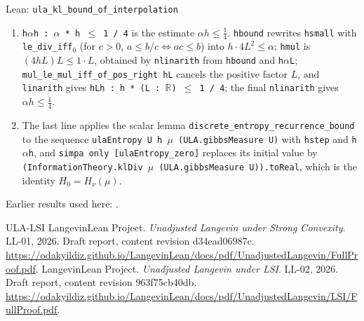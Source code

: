 \documentclass[11pt,a4paper]{article}
\begin{document}
\begin{leanbox}{Lean: \texttt{ula\_\allowbreak{}kl\_\allowbreak{}bound\_\allowbreak{}of\_\allowbreak{}interpolation}}
\begin{enumerate}
\item \texttt{h\ensuremath{\alpha}h : \ensuremath{\alpha} * h \ensuremath{\le} 1 /\allowbreak{} 4} is the estimate \(\alpha h\le\frac14\). \texttt{hbound} rewrites \texttt{hsmall} with \texttt{le\_\allowbreak{}div\_\allowbreak{}iff\ensuremath{{}_{0}}} (for \(c>0\), \(a\le b/c\iff ac\le b\)) into \(h\cdot4L^2\le\alpha\); \texttt{hmul} is \((4hL)L\le1\cdot L\), obtained by \texttt{nlinarith} from \texttt{hbound} and \texttt{h\ensuremath{\alpha}\allowbreak{}L}; \texttt{mul\_\allowbreak{}le\_\allowbreak{}mul\_\allowbreak{}iff\_\allowbreak{}of\_\allowbreak{}pos\_\allowbreak{}right h\allowbreak{}L} cancels the positive factor \(L\), and \texttt{linarith} gives \texttt{h\allowbreak{}Lh : h * (L : \ensuremath{\mathbb R}) \ensuremath{\le} 1 /\allowbreak{} 4}; the final \texttt{nlinarith} gives \(\alpha h\le\frac14\).

\item The last line applies the scalar lemma \texttt{discrete\_\allowbreak{}entropy\_\allowbreak{}recurrence\_\allowbreak{}bound} to the sequence \texttt{ula\allowbreak{}Entropy U h \ensuremath{\mu} (ULA.\allowbreak{}gibbs\allowbreak{}Measure U)} with \texttt{hstep} and \texttt{h\ensuremath{\alpha}h}, and \texttt{simpa only [ula\allowbreak{}Entropy\_\allowbreak{}zero]} replaces its initial value by \texttt{(Information\allowbreak{}Theory.\allowbreak{}kl\allowbreak{}Div \ensuremath{\mu} (ULA.\allowbreak{}gibbs\allowbreak{}Measure U)).\allowbreak{}to\allowbreak{}Real}, which is the identity \(H_0=H_\nu(\mu)\).

\end{enumerate}
\end{leanbox}


Earlier results used here: \cite[Section~3.26.3]{LangevinLean2026ULASC}.

\begin{thebibliography}{ULA-LSI}
LangevinLean Project. \emph{Unadjusted Langevin under Strong Convexity}. LL-01, 2026. Draft report, content revision d34ead06987c. \url{https://odakyildiz.github.io/LangevinLean/docs/pdf/UnadjustedLangevin/FullProof.pdf}.
LangevinLean Project. \emph{Unadjusted Langevin under LSI}. LL-02, 2026. Draft report, content revision 963f75cb40db. \url{https://odakyildiz.github.io/LangevinLean/docs/pdf/UnadjustedLangevin/LSI/FullProof.pdf}.
\end{thebibliography}
\end{document}
